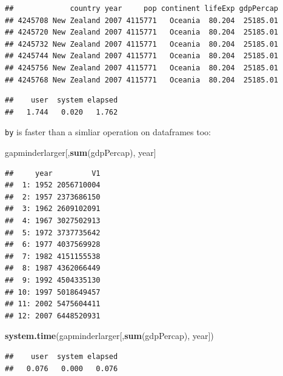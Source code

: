 \documentclass[]{article}
\newenvironment{Shaded}{\begin{snugshade}}{\end{snugshade}}
\newcommand{\KeywordTok}[1]{\textcolor[rgb]{0.13,0.29,0.53}{\textbf{{#1}}}}
\newcommand{\StringTok}[1]{\textcolor[rgb]{0.31,0.60,0.02}{{#1}}}
\newcommand{\NormalTok}[1]{{#1}}
\begin{document}
\begin{verbatim}
##             country year     pop continent lifeExp gdpPercap
## 4245708 New Zealand 2007 4115771   Oceania  80.204  25185.01
## 4245720 New Zealand 2007 4115771   Oceania  80.204  25185.01
## 4245732 New Zealand 2007 4115771   Oceania  80.204  25185.01
## 4245744 New Zealand 2007 4115771   Oceania  80.204  25185.01
## 4245756 New Zealand 2007 4115771   Oceania  80.204  25185.01
## 4245768 New Zealand 2007 4115771   Oceania  80.204  25185.01
\end{verbatim}

\begin{Shaded}
\end{Shaded}

\begin{verbatim}
##    user  system elapsed 
##   1.744   0.020   1.762
\end{verbatim}

\texttt{by} is faster than a simliar operation on dataframes too:

\begin{Shaded}
\begin{Highlighting}[]
\NormalTok{gapminderlarger[,}\KeywordTok{sum}\NormalTok{(gdpPercap), year]}
\end{Highlighting}
\end{Shaded}

\begin{verbatim}
##     year         V1
##  1: 1952 2056710004
##  2: 1957 2373686150
##  3: 1962 2609102091
##  4: 1967 3027502913
##  5: 1972 3737735642
##  6: 1977 4037569928
##  7: 1982 4151155538
##  8: 1987 4362066449
##  9: 1992 4504335130
## 10: 1997 5018649457
## 11: 2002 5475604411
## 12: 2007 6448520931
\end{verbatim}

\begin{Shaded}
\begin{Highlighting}[]
\KeywordTok{system.time}\NormalTok{(gapminderlarger[,}\KeywordTok{sum}\NormalTok{(gdpPercap), year])}
\end{Highlighting}
\end{Shaded}

\begin{verbatim}
##    user  system elapsed 
##   0.076   0.000   0.076
\end{verbatim}
\end{document}
